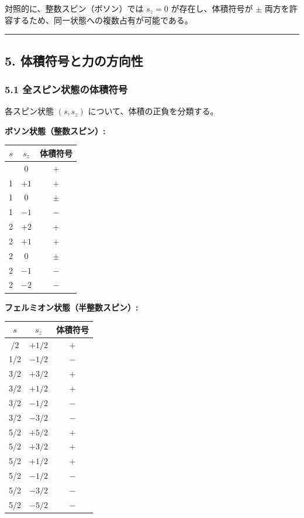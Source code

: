 \documentclass[a4paper,11pt]{ltjsarticle}
\newcounter{none}
\begin{document}
対照的に、整数スピン（ボソン）では $s_z = 0$ が存在し、体積符号が
$\pm$ 両方を許容するため、同一状態への複数占有が可能である。

\begin{center}\rule{0.5\linewidth}{0.5pt}\end{center}

\subsection*{5. 体積符号と力の方向性}

\subsubsection*{5.1 全スピン状態の体積符号}

各スピン状態 $(s, s_z)$ について、体積の正負を分類する。

\textbf{ボソン状態（整数スピン）:}

{\def\LTcaptype{none}
\begin{longtable}[]{@{}ccc@{}}
\toprule
$s$ & $s_z$ & 体積符号 \\
\midrule
\endhead
\bottomrule
\endlastfoot
0 & 0 & $+$ \\
1 & $+1$ & $+$ \\
1 & $0$ & $\pm$ \\
1 & $-1$ & $-$ \\
2 & $+2$ & $+$ \\
2 & $+1$ & $+$ \\
2 & $0$ & $\pm$ \\
2 & $-1$ & $-$ \\
2 & $-2$ & $-$ \\
\end{longtable}
}

\textbf{フェルミオン状態（半整数スピン）:}

{\def\LTcaptype{none}
\begin{longtable}[]{@{}ccc@{}}
\toprule
$s$ & $s_z$ & 体積符号 \\
\midrule
\endhead
\bottomrule
\endlastfoot
1/2 & $+1/2$ & $+$ \\
1/2 & $-1/2$ & $-$ \\
3/2 & $+3/2$ & $+$ \\
3/2 & $+1/2$ & $+$ \\
3/2 & $-1/2$ & $-$ \\
3/2 & $-3/2$ & $-$ \\
5/2 & $+5/2$ & $+$ \\
5/2 & $+3/2$ & $+$ \\
5/2 & $+1/2$ & $+$ \\
5/2 & $-1/2$ & $-$ \\
5/2 & $-3/2$ & $-$ \\
5/2 & $-5/2$ & $-$ \\
\end{longtable}
}
\end{document}
